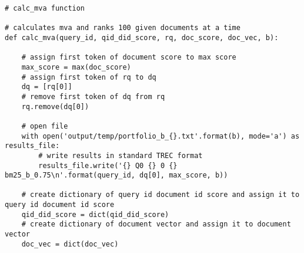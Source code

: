 \documentclass{article} %
\begin{document}
\begin{lstlisting}[style=Python]
# calc_mva function

# calculates mva and ranks 100 given documents at a time
def calc_mva(query_id, qid_did_score, rq, doc_score, doc_vec, b):

    # assign first token of document score to max score
    max_score = max(doc_score)
    # assign first token of rq to dq
    dq = [rq[0]]
    # remove first token of dq from rq
    rq.remove(dq[0])

    # open file
    with open('output/temp/portfolio_b_{}.txt'.format(b), mode='a') as results_file:
        # write results in standard TREC format
        results_file.write('{} Q0 {} 0 {} bm25_b_0.75\n'.format(query_id, dq[0], max_score, b))

    # create dictionary of query id document id score and assign it to query id document id score
    qid_did_score = dict(qid_did_score)
    # create dictionary of document vector and assign it to document vector
    doc_vec = dict(doc_vec)


\end{lstlisting}
\end{document}

